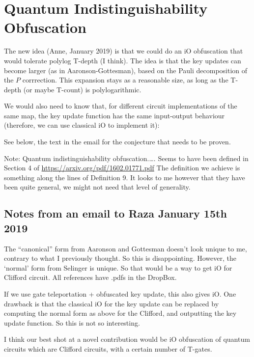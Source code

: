 
\section{Quantum Indistinguishability Obfuscation}
\label{sec:QiO-Cliffords and more}

The new idea (Anne, January 2019) is that we could do an iO obfuscation that would tolerate polylog T-depth (I think). The idea is that the key updates can become larger (as in Aaronson-Gottesman), based on the Pauli decomposition of the $P$ corrrection. This expansion stays as a reasonable size, as long as the T-depth (or maybe T-count) is polylogarithmic. 

We would also need to know that, for different circuit implementations of the same map, the key update function has the same input-output behaviour (therefore, we can use classical iO to implement it): 


 

\begin{theorem}
See below, the text in the email for the conjecture that needs to be proven. 
\end{theorem} 


Note: Quantum indistinguishability obfuscation.…. Seems to have been defined in Section 4 of \url{https://arxiv.org/pdf/1602.01771.pdf}
The definition we achieve is something along the lines of Definition 9. It looks to me however that they have been quite general, we might not need that level of generality.


\subsection{Notes from an email to Raza January 15th 2019}
The “canonical” form from Aaronson and Gottesman doesn’t look unique to me, contrary to what I previously thought. So this is disappointing. However, the ‘normal’ form from Selinger is unique. So that would be a way to get iO for Clifford circuit. All references have .pdfs in the DropBox.

If we use gate teleportation + obfuscated key update, this also gives iO. One drawback is that the classical iO for the key update can be replaced by computing the normal form as above for the Clifford, and outputting the key update function. So this is not so interesting.

I think our best shot at a novel contribution would be iO obfuscation of quantum circuits which are Clifford circuits, with a certain number of T-gates.

